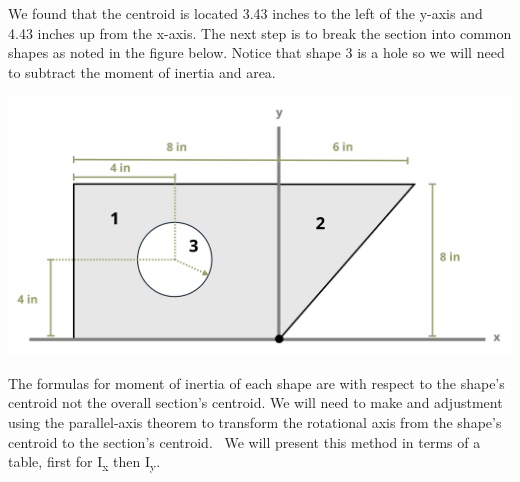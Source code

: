 \documentclass[
  letterpaper,
  DIV=11,
  numbers=noendperiod]{scrreprt}
\theoremstyle{definition}
\theoremstyle{remark}
\begin{document}
\begin{tcolorbox}
\begin{tcolorbox}
We found that the centroid is located 3.43 inches to the left of the
y-axis and 4.43 inches up from the x-axis. The next step is to break the
section into common shapes as noted in the figure below. Notice that
shape 3 is a hole so we will need to subtract the moment of inertia and
area.

\begin{center}
\includegraphics[width=5.67708in,height=\textheight]{images/CH 8 PNGs/example 8.6 part 3.png}
\end{center}

The formulas for moment of inertia of each shape are with respect to the
shape's centroid not the overall section's centroid. We will need to
make and adjustment using the parallel-axis theorem to transform the
rotational axis from the shape's centroid to the section's centroid.~ We
will present this method in terms of a table, first for
I\textsubscript{x} then I\textsubscript{y}.


\end{tcolorbox}
\end{tcolorbox}
\end{document}
